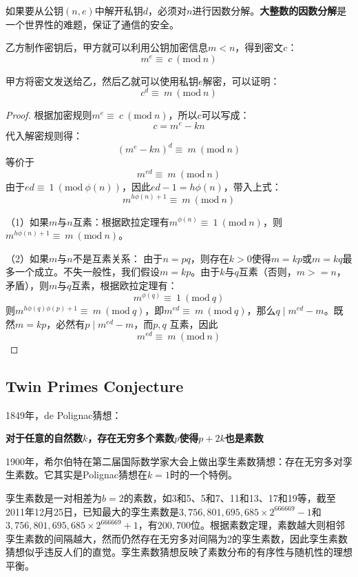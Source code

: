 如果要从公钥$(n,e)$中解开私钥$d$，必须对$n$进行因数分解。\textbf{大整数的因数分解}是一个世界性的难题，保证了通信的安全。

乙方制作密钥后，甲方就可以利用公钥加密信息$m<n$，得到密文$c$：
\begin{equation}
    m^e \equiv~c~(\text{mod}~n)
\end{equation}

甲方将密文发送给乙，然后乙就可以使用私钥$e$解密，可以证明：
\begin{equation}
    c^d \equiv~m~(\text{mod}~n)
\end{equation}

\begin{proof}
根据加密规则$m^e \equiv~c~(\text{mod}~n)$，所以$c$可以写成：
\[
    c = m^e - kn
\]
代入解密规则得：
\[
    (m^e - kn)^d \equiv~m~(\text{mod}~n)
\]
等价于
\[
    m^{ed} \equiv~m~(\text{mod}~n)
\]
由于$ed \equiv~1~(\text{mod}~\phi(n))$，因此$ed -1 = h\phi(n)$，带入上式：
\[
    m^{h\phi(n)+1} \equiv~m~(\text{mod}~n)
\]

（1）如果$m$与$n$互素：根据欧拉定理有$m^{\phi(n)} \equiv~1~(\text{mod}~n)$，则$m^{h\phi(n)+1} \equiv~m~(\text{mod}~n)$。

（2）如果$m$与$n$不是互素关系：
由于$n=pq$，则存在$k>0$使得$m=kp$或$m=kq$最多一个成立。不失一般性，我们假设$m=kp$。由于$k$与$q$互素（否则，$m>=n$，矛盾），则$m$与$q$互素，根据欧拉定理有：
\[
    m^{\phi(q)} \equiv~1~(\text{mod}~q)
\]
则$m^{h\phi(q)\phi(p) + 1}  \equiv~m~(\text{mod}~q)$，即$m^{ed} \equiv~m~(\text{mod}~q)$，那么$q\mid m^{ed}-m$。既然$m=kp$，必然有$p\mid m^{ed}-m$，而$p,q$ 互素，因此
\[
    m^{ed} \equiv~m~(\text{mod}~n)
\]
\end{proof}

\subsection{Twin Primes Conjecture}
1849年，de Polignac猜想：\\
\centerline{\textbf{对于任意的自然数$k$，存在无穷多个素数$p$使得$p+2k$也是素数}}

1900年，希尔伯特在第二届国际数学家大会上做出孪生素数猜想：存在无穷多对孪生素数。它其实是Polignac猜想在$k=1$时的一个特例。

孪生素数是一对相差为$b=2$的素数，如3和5、5和7、11和13、17和19等，截至2011年12月25日，已知最大的孪生素数是$3,756,801,695,685\times 2^{666669}-1$和$3,756,801,695,685\times 2^{666669}+1$，有$200,700$位。根据素数定理，素数越大则相邻孪生素数的间隔越大，然而仍然存在无穷多对间隔为2的孪生素数，因此孪生素数猜想似乎违反人们的直觉。孪生素数猜想反映了素数分布的有序性与随机性的理想平衡。

